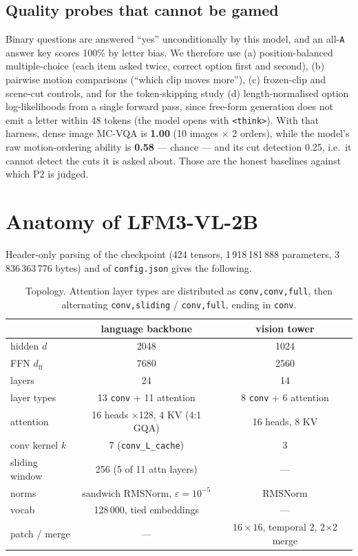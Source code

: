 \documentclass[11pt]{article}
\newcommand{\code}[1]{\texttt{\small #1}}
\begin{document}
\subsection{Quality probes that cannot be gamed}
Binary questions are answered ``yes'' unconditionally by this model, and an all-\texttt{A}
answer key scores 100\% by letter bias. We therefore use (a) position-balanced
multiple-choice (each item asked twice, correct option first and second), (b) pairwise
motion comparisons (``which clip moves more''), (c) frozen-clip and scene-cut controls,
and for the token-skipping study (d) length-normalised option log-likelihoods from a
single forward pass, since free-form generation does not emit a letter within 48 tokens
(the model opens with \code{<think>}). With that harness, dense image MC-VQA is
\textbf{1.00} (10 images $\times$ 2 orders), while the model's raw motion-ordering ability
is \textbf{0.58} --- chance --- and its cut detection 0.25, i.e.\ it cannot detect the
cuts it is asked about. Those are the honest baselines against which P2 is judged.

\section{Anatomy of LFM3-VL-2B}

Header-only parsing of the checkpoint (424 tensors, 1\,918\,181\,888 parameters,
3\,836\,363\,776 bytes) and of \code{config.json} gives the following.

\begin{table}[h]\centering\small
\begin{tabular}{l|cc}
\hline
 & language backbone & vision tower \\
\hline
hidden $d$ & 2048 & 1024 \\
FFN $d_{\mathrm{ff}}$ & 7680 & 2560 \\
layers & 24 & 14 \\
layer types & 13 \code{conv} + 11 attention & 8 \code{conv} + 6 attention \\
attention & 16 heads $\times$128, 4 KV (4:1 GQA) & 16 heads, 8 KV \\
conv kernel $k$ & 7 (\code{conv\_L\_cache}) & 3 \\
sliding window & 256 (5 of 11 attn layers) & --- \\
norms & sandwich RMSNorm, $\varepsilon=10^{-5}$ & RMSNorm \\
vocab & 128\,000, tied embeddings & --- \\
patch / merge & --- & $16\times16$, temporal 2, 2$\times$2 merge \\
\hline
\end{tabular}
\caption{Topology. Attention layer types are distributed as
\code{conv,conv,full}, then alternating \code{conv,sliding} / \code{conv,full},
ending in \code{conv}.}
\end{table}
\end{document}
